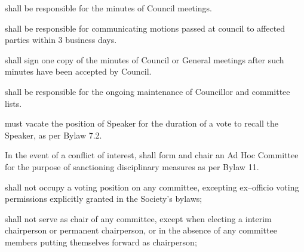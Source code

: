 \begin{longenum}[ label*=\thesubsection.\arabic*., align=left]
    \item shall be responsible for the minutes of Council meetings.
    \item shall be responsible for communicating motions passed at council to affected parties within 3 business days. 
    \item shall sign one copy of the minutes of Council or General meetings after such minutes have been accepted by Council.
    \item shall be responsible for the ongoing maintenance of Councillor and committee lists.
    \item must vacate the position of Speaker for the duration of a vote to recall the Speaker, as per Bylaw 7.2.
    \item In the event of a conflict of interest, shall form and chair an Ad Hoc Committee for the purpose of sanctioning disciplinary measures as per Bylaw 11.
     \item shall not occupy a voting position on any committee, excepting ex--officio voting permissions explicitly granted in the Society's bylaws;
	\item shall not serve as chair of any committee, except when electing a interim chairperson or permanent chairperson, or in the absence of any committee members putting themselves forward as chairperson;
\end{longenum}

